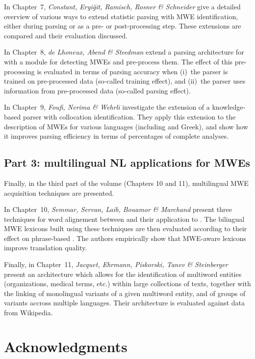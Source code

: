 \documentclass[output=paper]{langsci/langscibook}
\begin{document}
In Chapter~7, \textit{Constant, Eryiğit, Ramisch, Rosner \& Schneider}
give a detailed overview of various ways to extend statistic parsing
with MWE identification, either during parsing or as a pre- or
post-processing step. These extensions are compared and their
evaluation discussed.

In Chapter~8, \textit{de Lhoneux, Abend \& Steedman} extend a 
parsing architecture for  with a module for detecting MWEs and
pre-process them. The effect of this pre-processing is evaluated in
terms of parsing accuracy when (i)~the parser is trained on
pre-processed data (so-called training effect), and (ii)~the parser
uses information from pre-processed data (so-called parsing effect).

In Chapter~9, \textit{Foufi, Nerima \& Wehrli} investigate the
extension of a knowledge-based parser with collocation
identification. They apply this extension to the description of MWEs
for various languages (including  and Greek), and show how it
improves parsing efficiency in terms of percentages of complete
analyses.

\subsection*{Part 3: multilingual NL applications for MWEs}

Finally, in the third part of the volume (Chapters 10 and 11),
multilingual MWE acquisition techniques are presented.

In Chapter~10, \textit{Semmar, Servan, Laib, Bouamor \& Marchand}
present three techniques for word alignement between 
and their application to . The bilingual MWE
lexicons built using these techniques are then evaluated according to
their effect on phrase-based . The
authors empirically show that MWE-aware lexicons improve translation
quality.

Finally, in Chapter~11, \textit{Jacquet, Ehrmann, Piskorski, Tanev \&
  Steinberger} present an architecture which allows for the
identification of multiword entities (organizations, medical terms,
etc.) within large collections of texts, together with the linking of
monolingual variants of a given multiword entity, and of groups of
variants accross multiple languages. Their architecture is evaluated
against data from Wikipedia.

\section*{Acknowledgments}
\end{document}
